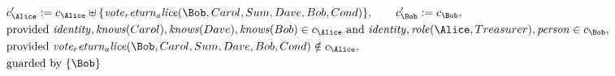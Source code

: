 \begin{align*}
&
c'_
{
\Alice
}
 := 
c_
{
\Alice
}
 \uplus 
\{
\mathit{
vote_return_alice
}
(
\Bob
,
Carol
,
Sum
,
Dave
,
Bob
,
Cond
)
\}
, \qquad 
c'_
{
\Bob
}
 := 
c_
{
\Bob
}
,\\
&
\text{provided } 
\mathit{
identity
}
,
\mathit{
knows
}
(
Carol
)
,
\mathit{
knows
}
(
Dave
)
,
\mathit{
knows
}
(
Bob
)
 \in c_
{
\Alice
}
 \text{ and } 
\mathit{
identity
}
,
\mathit{
role
}
(
\Alice
,
Treasurer
)
,
\mathit{
person
}
 \in c_
{
\Bob
}
,\\
&
\text{provided } 
\mathit{
vote_return_alice
}
(
\Bob
,
Carol
,
Sum
,
Dave
,
Bob
,
Cond
)
 \notin c_
{
\Alice
}
,\\
&
\text{guarded by } \{
\Bob
\}
\end{align*}

